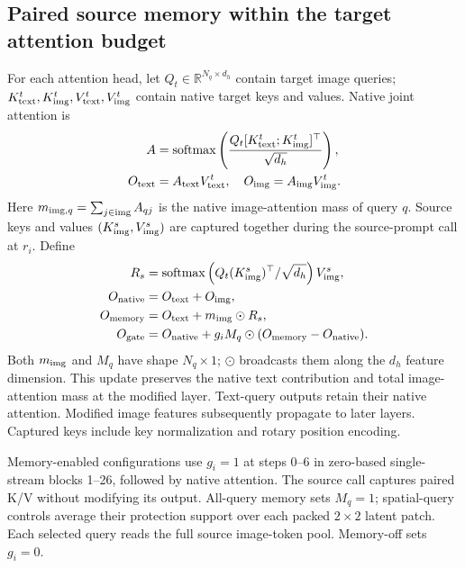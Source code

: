 \documentclass[conference]{IEEEtran}
\newcommand{\softmax}{\operatorname{softmax}}
\begin{document}
\subsection{Paired source memory within the target attention budget}
For each attention head, let $Q_t\in\mathbb R^{N_q\times d_h}$ contain target image queries; $K_{\rm text}^t,K_{\rm img}^t,V_{\rm text}^t,V_{\rm img}^t$ contain native target keys and values. Native joint attention is
\begin{equation}
\begin{aligned}
A&=\softmax\left(\frac{Q_t[K_{\rm text}^t;K_{\rm img}^t]^\top}{\sqrt{d_h}}\right),\\
O_{\rm text}&=A_{\rm text}V_{\rm text}^t,\quad O_{\rm img}=A_{\rm img}V_{\rm img}^t.
\end{aligned}
\end{equation}
Here $m_{{\rm img},q}=\sum_{j\in{\rm img}}A_{qj}$ is the native image-attention mass of query $q$. Source keys and values $(K_{\rm img}^s,V_{\rm img}^s)$ are captured together during the source-prompt call at $r_i$. Define
\begin{equation}
\begin{aligned}
R_s&=\softmax\left(Q_t(K_{\rm img}^s)^\top/\sqrt{d_h}\right)V_{\rm img}^s,\\
O_{\rm native}&=O_{\rm text}+O_{\rm img},\\
O_{\rm memory}&=O_{\rm text}+m_{\rm img}\odot R_s,\\
O_{\rm gate}&=O_{\rm native}+g_iM_q\odot(O_{\rm memory}-O_{\rm native}).
\end{aligned}
\label{eq:query-gate}
\end{equation}
Both $m_{\rm img}$ and $M_q$ have shape $N_q\times1$; $\odot$ broadcasts them along the $d_h$ feature dimension. This update preserves the native text contribution and total image-attention mass at the modified layer. Text-query outputs retain their native attention. Modified image features subsequently propagate to later layers. Captured keys include key normalization and rotary position encoding.

Memory-enabled configurations use $g_i=1$ at steps 0--6 in zero-based single-stream blocks 1--26, followed by native attention. The source call captures paired K/V without modifying its output. All-query memory sets $M_q=1$; spatial-query controls average their protection support over each packed $2\times2$ latent patch. Each selected query reads the full source image-token pool. Memory-off sets $g_i=0$.
\end{document}
